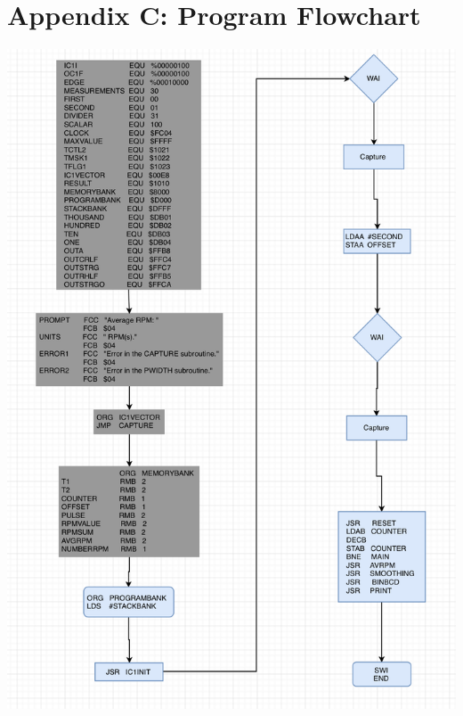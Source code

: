 \documentclass[12pt]{report}
\begin{document}
\section*{Appendix C: Program Flowchart}
	\begin{center}
	  \includegraphics[scale=0.83]{main.PNG}
     \newpage{}

\end{center}
\end{document}
